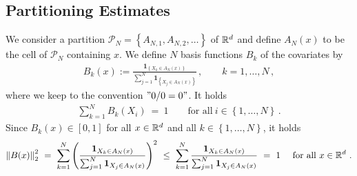 \subsection*{Partitioning Estimates}
We consider a partition
$
  \mathcal{P}_N
  =
  \left\{ 
    A_{N,1}
    ,
    A_{N,2}
    ,
    \ldots
  \right\}
$
of $ \mathbb{R}^d $
and define
$ A_N(x) $ to be the cell of $ \mathcal{P}_N $ containing $x$.
We define $N$ basis functions $B_k$ of the covariates by
\begin{gather*}
  B_k(x)
  :=
  \frac{
  \mathbf{1}_{\left\{ X_k \in A_N(x) \right\}}
  }{
  \sum_{j=1}^{N} 
  \mathbf{1}_{\left\{ X_j \in A_N(x) \right\}}
  }
  \,,
  \qquad
  k=
  1,\ldots,N
  \,,
\end{gather*}
where we keep to the convention $"0/0=0"$.
It holds
\begin{gather}
  \label{basis_conv_comb}
  \sum_{k=1}^{N}B_k(X_i)
  \ 
  =
  \ 
  1
  \qquad
  \text{for all}\ 
  i\in \left\{ 1,\ldots,N \right\}
  \,.
\end{gather}
Since 
$
B_k(x)\in [0,1]
$ 
for all
$x\in\mathbb{R}^d$
and all $k\in \left\{ 1,\ldots,N \right\}$,
it holds
\begin{gather}
  \label{basis_l2_bdd}
  \norm{B(x)}_2^2
  \ 
  =
  \ 
  \sum_{k=1}^{N} 
  \left( 
  \frac{
  \mathbf{1}_{X_k \in A_N(x)}
  }{
  \sum_{j=1}^{N} 
  \mathbf{1}_{X_j \in A_N(x)}
  }
  \right)
  ^2
  \ 
  \le
  \ 
  \sum_{k=1}^{N} 
  \frac{
  \mathbf{1}_{X_k \in A_N(x)}
  }{
  \sum_{j=1}^{N} 
  \mathbf{1}_{X_j \in A_N(x)}
  }
  \ 
  =
  \ 
  1
  \quad
  \text{
    for all
  }
x\in\R^d
\,
\,.
\end{gather}
